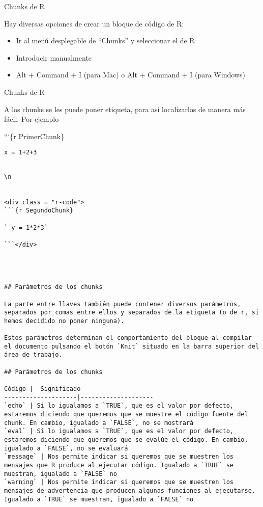 \documentclass[
  ignorenonframetext,
]{beamer}
\providecommand{\tightlist}{%
  \setlength{\itemsep}{0pt}\setlength{\parskip}{0pt}}
\begin{document}
\begin{frame}{Chunks de R}
\protect\hypertarget{chunks-de-r-1}{}

Hay diversas opciones de crear un bloque de código de R:

\begin{itemize}
\tightlist
\item
  Ir al menú desplegable de ``Chunks'' y seleccionar el de R
\item
  Introducir manualmente
\item
  Alt + Command + I (para Mac) o Alt + Command + I (para Windows)
\end{itemize}

\end{frame}

\begin{frame}[fragile]{Chunks de R}
\protect\hypertarget{chunks-de-r-2}{}

A los chunks se les puede poner etiqueta, para así localizarlos de
manera más fácil. Por ejemplo

```\{r PrimerChunk\}

\texttt{x\ =\ 1+2+3}

\begin{verbatim}

\n


<div class = "r-code">
```{r SegundoChunk}

` y = 1*2*3`

```</div>




## Parámetros de los chunks

La parte entre llaves también puede contener diversos parámetros, separados por comas entre ellos y separados de la etiqueta (o de r, si hemos decidido no poner ninguna).

Estos parámetros determinan el comportamiento del bloque al compilar el documento pulsando el botón `Knit` situado en la barra superior del área de trabajo.

## Parámetros de los chunks

Código |  Significado                                  
--------------------|--------------------
`echo` | Si lo igualamos a `TRUE`, que es el valor por defecto, estaremos diciendo que queremos que se muestre el código fuente del chunk. En cambio, igualado a `FALSE`, no se mostrará
`eval` | Si lo igualamos a `TRUE`, que es el valor por defecto, estaremos diciendo que queremos que se evalúe el código. En cambio, igualado a `FALSE`, no se evaluará
`message` | Nos permite indicar si queremos que se muestren los mensajes que R produce al ejecutar código. Igualado a `TRUE` se muestran, igualado a `FALSE` no
`warning` | Nos permite indicar si queremos que se muestren los mensajes de advertencia que producen algunas funciones al ejecutarse. Igualado a `TRUE` se muestran, igualado a `FALSE` no


\end{verbatim}
\end{frame}
\end{document}
